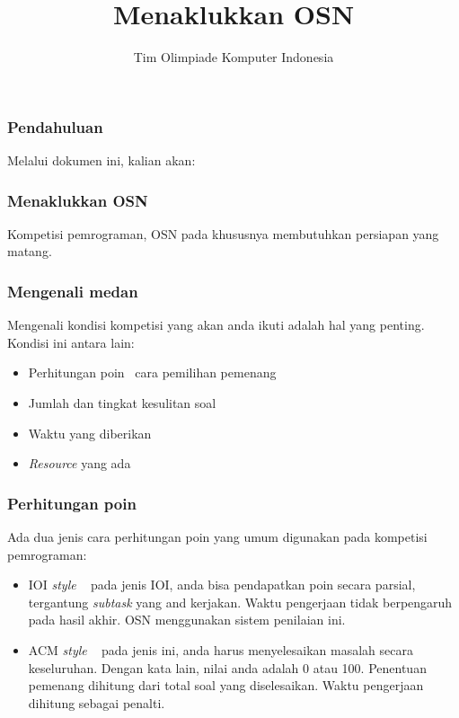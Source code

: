  

\title{Menaklukkan OSN}
\author{Tim Olimpiade Komputer Indonesia}
\date{}



\begin{frame}
	\titlepage
\end{frame}

\begin{frame}
	\frametitle{Pendahuluan}
	Melalui dokumen ini, kalian akan:

\end{frame}
	
\begin{frame}
	\frametitle{Menaklukkan OSN}
	Kompetisi pemrograman, OSN pada khususnya membutuhkan persiapan yang matang.
	
	
\end{frame}

\begin{frame}
	\frametitle{Mengenali medan}
	Mengenali kondisi kompetisi yang akan anda ikuti adalah hal yang penting. Kondisi ini antara lain:
	\begin{itemize}
		\item Perhitungan poin \ cara pemilihan pemenang
		\item Jumlah dan tingkat kesulitan soal
		\item Waktu yang diberikan
		\item \textit{Resource} yang ada
	\end{itemize}
\end{frame}


\begin{frame}
	\frametitle{Perhitungan poin}
	Ada dua jenis cara perhitungan poin yang umum digunakan pada kompetisi pemrograman:
	\begin{itemize}
		\item IOI \textit{style}
		~
		pada jenis IOI, anda bisa pendapatkan poin secara parsial, tergantung \textit{subtask} yang and kerjakan. Waktu pengerjaan tidak berpengaruh pada hasil akhir. OSN menggunakan sistem penilaian ini.
		
		\item ACM \textit{style}
		~
		pada jenis ini, anda harus menyelesaikan masalah secara keseluruhan. Dengan kata lain, nilai anda adalah 0 atau 100. Penentuan pemenang dihitung dari total soal yang diselesaikan.  Waktu pengerjaan dihitung sebagai penalti.
	\end{itemize}
\end{frame}

